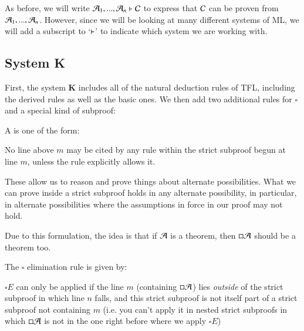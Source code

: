 \documentclass[12pt, a4paper, oneside, openright, titlepage]{book}
\begin{document}
As before, we will write $\mathcal{A}_1,...,\mathcal{A}_n \vdash \mathcal{C}$ to express that $\mathcal{C}$ can be proven from $\mathcal{A}_1,...,\mathcal{A}_n$. However, since we will be looking at many different systems of ML, we will add a subscript to `$\vdash$' to indicate which system we are working with.

\subsection{\textsection System \textbf{K}}

First, the system \textbf{K} includes all of the natural deduction rules of TFL, including the derived rules as well as the basic ones. We then add two additional rules for $\square$ and a special kind of subproof:

\begin{defn}
    A  is one of the form:
    \begin{fitchproof}
        \open
        \close
         
    \end{fitchproof}
    No line above $m$ may be cited by any rule within the strict subproof begun at line $m$, unless the rule explicitly allows it.
\end{defn}

These allow us to reason and prove things about alternate possibilities. What we can prove inside a strict subproof holds in any alternate possibility, in particular, in alternate possibilities where the assumptions in force in our proof may not hold. 

Due to this formulation, the idea is that if $\mathcal{A}$ is a theorem, then $\square\mathcal{A}$ should be a theorem too.

\begin{defn}
    The $\square$ elimination rule is given by: 
    \begin{fitchproof}
        \open
             
        \close
    \end{fitchproof}
    $\square E$ can only be applied if the line $m$ (containing $\square \mathcal{A}$) lies \emph{outside} of the strict subproof in which line $n$ falls, and this strict subproof is not itself part of a strict subproof not containing $m$ (i.e. you can't apply it in nested strict subproofs in which $\square\mathcal{A}$ is not in the one right before where we apply $\square E$)
\end{defn}
\end{document}
